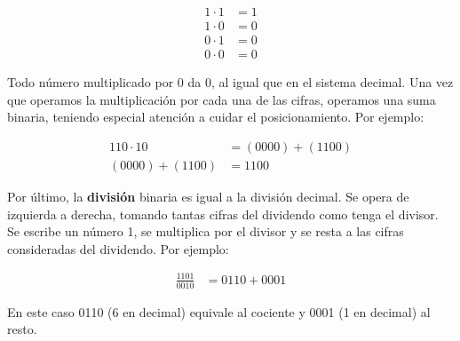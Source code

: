 \begin{align*}
1 \cdot 1 &= 1\\
1 \cdot 0 &= 0\\
0 \cdot 1 &= 0\\
0 \cdot 0 &= 0
\end{align*}

Todo número multiplicado por 0 da 0, al igual que en el sistema decimal. Una vez que operamos la multiplicación por cada una de las cifras, operamos una suma binaria, teniendo especial atención a cuidar el posicionamiento. Por ejemplo:

\begin{align*}
110 \cdot 10 &= (0000) + (1100)\\
(0000) + (1100) &= 1100
\end{align*}

Por último, la \textbf{división} binaria es igual a la división decimal. Se opera de izquierda a derecha, tomando tantas cifras del dividendo como tenga el divisor. Se escribe un número 1, se multiplica por el divisor y se resta a las cifras consideradas del dividendo. Por ejemplo:

\begin{align*}
\frac{1101}{0010} &= 0110 + 0001
\end{align*}

En este caso 0110 (6 en decimal) equivale al cociente y 0001 (1 en decimal) al resto.
